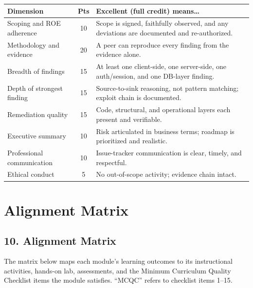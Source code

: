 \documentclass[11pt,letterpaper,oneside]{report}
\begin{document}
\begin{tcolorbox}[callout,colback=afpaper,colframe=afnavy,colbacktitle=afnavy,title=Capstone Rubric (100 points)]
\begin{tabularx}{\linewidth}{@{}R{4.6cm} c >{\RaggedRight\arraybackslash}X@{}}
\toprule
\sffamily\bfseries Dimension & \sffamily\bfseries Pts & \sffamily\bfseries Excellent (full credit) means\dots \\
\midrule
Scoping and ROE adherence            & 10 & Scope is signed, faithfully observed, and any deviations are documented and re-authorized.\\
Methodology and evidence             & 20 & A peer can reproduce every finding from the evidence alone.\\
Breadth of findings                  & 15 & At least one client-side, one server-side, one auth/session, and one DB-layer finding.\\
Depth of strongest finding           & 15 & Source-to-sink reasoning, not pattern matching; exploit chain is documented.\\
Remediation quality                  & 15 & Code, structural, and operational layers each present and verifiable.\\
Executive summary                    & 10 & Risk articulated in business terms; roadmap is prioritized and realistic.\\
Professional communication           & 10 & Issue-tracker communication is clear, timely, and respectful.\\
Ethical conduct                      &  5 & No out-of-scope activity; evidence chain intact.\\
\bottomrule
\end{tabularx}
\end{tcolorbox}

\chapter*{Alignment Matrix}

\section*{10. Alignment Matrix}
The matrix below maps each module's learning outcomes to its instructional activities, hands-on lab, assessments, and the Minimum Curriculum Quality Checklist items the module satisfies. ``MCQC'' refers to checklist items 1--15.
\end{document}
